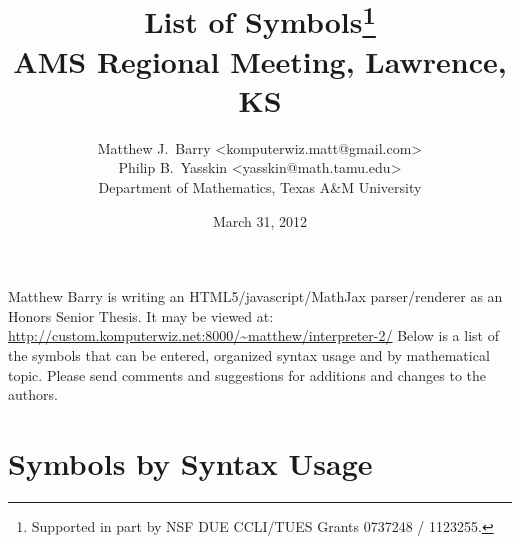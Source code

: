 \documentclass{article}
\begin{document}
  \title{List of Symbols\thanks{Supported in part by NSF DUE CCLI/TUES Grants 0737248 / 1123255.}\\
  AMS Regional Meeting, Lawrence, KS}
  \author{Matthew J.~Barry  <komputerwiz.matt@gmail.com> \\
          Philip B.~Yasskin <yasskin@math.tamu.edu>\\
          Department of Mathematics, Texas A\&M University}
  \date{March 31, 2012}
  \maketitle
  
  \vspace{-15 pt}
  
  Matthew Barry is writing an HTML5/javascript/MathJax parser/renderer as an Honors Senior Thesis. It may be viewed at: \qquad \url{http://custom.komputerwiz.net:8000/~matthew/interpreter-2/} \qquad
  Below is a list of the symbols that can be entered, organized syntax usage and by mathematical topic. Please send comments and suggestions for additions and changes to the authors.
  
  \vspace{-10 pt}

  \section{Symbols by Syntax Usage} %
  \label{sec:syntax}
\end{document}
